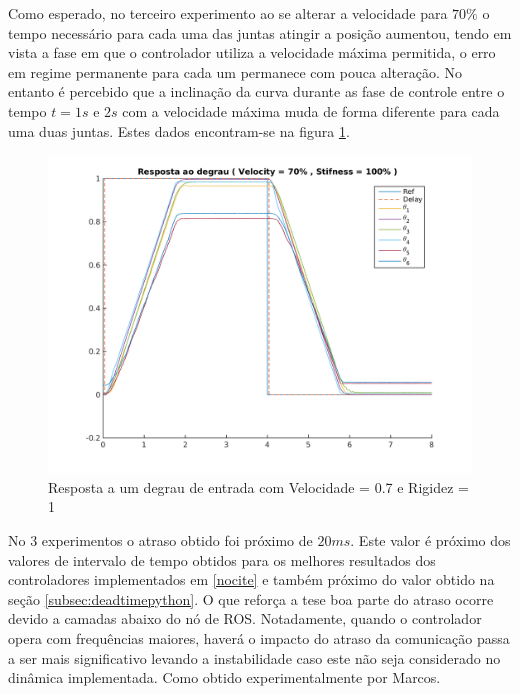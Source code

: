 Como esperado, no terceiro experimento ao se alterar a velocidade para $70\%$ o tempo necessário para cada uma das juntas atingir a posição aumentou, tendo em vista a fase em que o controlador utiliza a velocidade máxima permitida, o erro em regime permanente para cada um permanece com pouca alteração. No entanto é percebido que a inclinação da curva durante as fase de controle entre o tempo $t=1s$ e $2s$ com a velocidade máxima muda de forma diferente para cada uma duas juntas. Estes dados encontram-se na figura \ref{fig:jointIdentification_exp3v70v100}.

\begin{figure}[H]
    \centering
    \includegraphics[width=\linewidth]{tex/figs/jointIdentification_exp3v70v100.png}
    \caption{Resposta a um degrau de entrada com Velocidade = 0.7 e Rigidez = 1}
    \label{fig:jointIdentification_exp3v70v100}
\end{figure}

No 3 experimentos o atraso obtido foi próximo de $20ms$. Este valor é próximo dos valores de intervalo de tempo obtidos para os melhores resultados dos controladores implementados em \ref{nocite} e também próximo do valor obtido na seção \ref{subsec:deadtimepython}. O que reforça a tese boa parte do atraso ocorre devido a camadas abaixo do nó de ROS. Notadamente, quando o controlador opera com frequências maiores, haverá o impacto do atraso da comunicação passa a ser mais significativo levando a instabilidade caso este não seja considerado no dinâmica implementada. Como obtido experimentalmente por Marcos.


